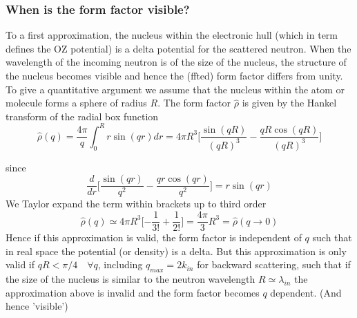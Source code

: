 \documentclass[11pt,a4paper]{article}
\begin{document}
\subsubsection{When is the form factor visible?}
To a first approximation, the nucleus within the electronic hull (which in term defines the OZ potential) is a delta potential
for the scattered neutron. When the wavelength of the incoming neutron is of the size of the nucleus, the structure of the nucleus
becomes visible and hence the (ffted) form factor differs from unity. To give a quantitative argument we assume that the nucleus
within the atom or molecule forms a sphere of radius $R$. The form factor $\hat \rho$ is given by the Hankel transform of the
radial box function
\begin{equation}
\hat \rho (q) = \frac{4\pi}{ q} \int_0^R r \sin(qr) dr 
=
4 \pi R^3 \lbrack \frac{\sin(qR)}{ (qR)^3} - \frac{qR \cos(qR)}{ (qR)^3}  \rbrack
\end{equation}

since 
\begin{equation}
\frac{d}{dr} \lbrack \frac{\sin(qr)}{ q^2} - \frac{qr \cos(qr)}{ q^2}  \rbrack
=
r \sin(qr)
\end{equation}
We Taylor expand the term within brackets up to third order
\begin{equation}
\hat \rho (q) \simeq
4 \pi R^3 \lbrack -\frac{1}{3!} + \frac{1}{2!} \rbrack
=
\frac{4 \pi}{3} R^3
= \hat \rho (q \rightarrow 0)
\end{equation}
Hence if this approximation is valid, the form factor is independent of $q$ such that in real space the potential (or density)
is a delta. But this approximation is only valid if $qR < \pi/4 \quad \forall q$, including $q_{max} = 2k_{in}$ for backward
scattering, such that if the size of the nucleus is similar to the neutron wavelength $R \simeq \lambda_{in}$ the approximation above
is invalid and the form factor becomes $q$ dependent. (And hence 'visible')

\end{document}
